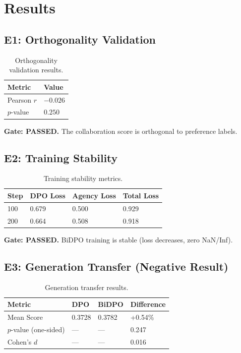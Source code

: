 \section{Results}

\subsection{E1: Orthogonality Validation}

\begin{table}[h]
\centering
\begin{tabular}{ll}
\toprule
\textbf{Metric} & \textbf{Value} \\
\midrule
Pearson $r$ & $-0.026$ \\
$p$-value & $0.250$ \\
\bottomrule
\end{tabular}
\caption{Orthogonality validation results.}
\end{table}

\textbf{Gate: PASSED.} The collaboration score is orthogonal to preference labels.

\subsection{E2: Training Stability}

\begin{table}[h]
\centering
\begin{tabular}{llll}
\toprule
\textbf{Step} & \textbf{DPO Loss} & \textbf{Agency Loss} & \textbf{Total Loss} \\
\midrule
100 & 0.679 & 0.500 & 0.929 \\
200 & 0.664 & 0.508 & 0.918 \\
\bottomrule
\end{tabular}
\caption{Training stability metrics.}
\end{table}

\textbf{Gate: PASSED.} BiDPO training is stable (loss decreases, zero NaN/Inf).

\subsection{E3: Generation Transfer (Negative Result)}

\begin{table}[h]
\centering
\begin{tabular}{llll}
\toprule
\textbf{Metric} & \textbf{DPO} & \textbf{BiDPO} & \textbf{Difference} \\
\midrule
Mean Score & 0.3728 & 0.3782 & +0.54\% \\
$p$-value (one-sided) & --- & --- & 0.247 \\
Cohen's $d$ & --- & --- & 0.016 \\
\bottomrule
\end{tabular}
\caption{Generation transfer results.}
\end{table}

